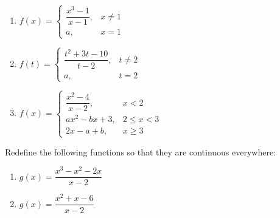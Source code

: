 \documentclass[answers]{exam}
\begin{document}
    \begin{enumerate}[itemsep=\stretch{1}]
      \item 
        $f(x)=\begin{cases}
          \dfrac{x^3-1}{x-1},& x\neq 1\\
          a,& x=1
        \end{cases}$
      \item 
        $f(t)=\begin{cases}
          \dfrac{t^2+3t-10}{t-2},& t\neq2\\
          a,& t=2
        \end{cases}$
    \pagebreak

      \item 
        $f(x)=\begin{cases}
          \dfrac{x^2-4}{x-2},& x<2\\
          ax^2-bx+3,& 2\leq x<3\\
          2x-a+b,& x\geq 3
        \end{cases}$
    \end{enumerate}
  \begin{ex*}
    Redefine the following functions so that they are continuous everywhere:
    \begin{enumerate}[itemsep=\stretch{1}]
      \item $g(x)=\dfrac{x^3-x^2-2x}{x-2}$
      \item $g(x)=\dfrac{x^2+x-6}{x-2}$
    \end{enumerate}
  \end{ex*}
  \pagebreak
  
  
\end{document}
